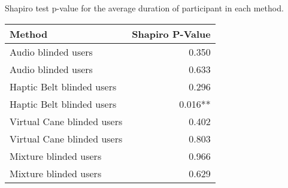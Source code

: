 
\centering
\caption{Shapiro test p-value for the average duration of participant in each method.}
\label{tab:shapiro_duration_avg}
\begin{tabular}{lr}
\toprule
                    Method & Shapiro P-Value \\
\midrule
       Audio blinded users &           0.350 \\
       Audio blinded users &           0.633 \\
 Haptic Belt blinded users &           0.296 \\
 Haptic Belt blinded users &         0.016** \\
Virtual Cane blinded users &           0.402 \\
Virtual Cane blinded users &           0.803 \\
     Mixture blinded users &           0.966 \\
     Mixture blinded users &           0.629 \\
\bottomrule
\end{tabular}
